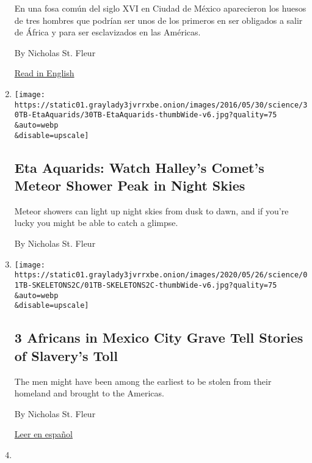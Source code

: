 \begin{enumerate}
  En una fosa común del siglo XVI en Ciudad de México aparecieron los
  huesos de tres hombres que podrían ser unos de los primeros en ser
  obligados a salir de África y para ser esclavizados en las Américas.

  By Nicholas St. Fleur

  \href{https://www.nytimes3xbfgragh.onion/2020/05/01/science/africans-slavery-mexico-grave.html}{Read
  in English}
\item
  \href{/2020/05/04/science/eta-aquarids-meteor-shower.html}{}

  \texttt{[image: https://static01.graylady3jvrrxbe.onion/images/2016/05/30/science/30TB-EtaAquarids/30TB-EtaAquarids-thumbWide-v6.jpg?quality=75\\\&auto=webp\\\&disable=upscale]}

  \hypertarget{eta-aquarids-watch-halleys-comets-meteor-shower-peak-in-night-skies}{%
  \subsection{Eta Aquarids: Watch Halley's Comet's Meteor Shower Peak in
  Night
  Skies}\label{eta-aquarids-watch-halleys-comets-meteor-shower-peak-in-night-skies}}

  Meteor showers can light up night skies from dusk to dawn, and if
  you're lucky you might be able to catch a glimpse.

  By Nicholas St. Fleur
\item
  \href{/2020/05/01/science/africans-slavery-mexico-grave.html}{}

  \texttt{[image: https://static01.graylady3jvrrxbe.onion/images/2020/05/26/science/01TB-SKELETONS2C/01TB-SKELETONS2C-thumbWide-v6.jpg?quality=75\\\&auto=webp\\\&disable=upscale]}

  \hypertarget{3-africans-in-mexico-city-grave-tell-stories-of-slaverys-toll}{%
  \subsection{3 Africans in Mexico City Grave Tell Stories of Slavery's
  Toll}\label{3-africans-in-mexico-city-grave-tell-stories-of-slaverys-toll}}

  The men might have been among the earliest to be stolen from their
  homeland and brought to the Americas.

  By Nicholas St. Fleur

  \href{https://www.nytimes3xbfgragh.onion/es/2020/05/26/espanol/ciencia-y-tecnologia/esclavitud-africa-mexico.html}{Leer
  en español}
\item
  \href{/2020/04/22/science/throwing-stick-hunting.html}{}


\end{enumerate}
